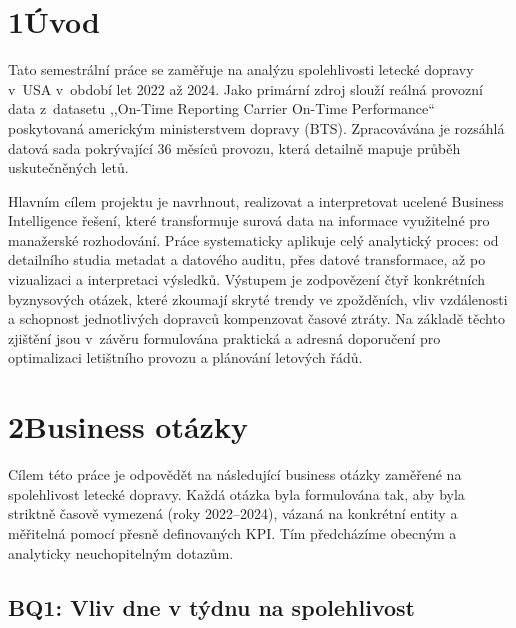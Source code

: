 \documentclass{protokol}
\begin{document}
\maketitle\newpage
\tableofcontents\newpage
{}

\section{1\quad Úvod}

Tato semestrální práce se zaměřuje na analýzu spolehlivosti letecké dopravy v~USA v~období let 2022 až 2024. Jako primární zdroj slouží reálná provozní data z~datasetu ,,On-Time Reporting Carrier On-Time Performance`` poskytovaná americkým ministerstvem dopravy (BTS). Zpracovávána je rozsáhlá datová sada pokrývající 36 měsíců provozu, která detailně mapuje průběh uskutečněných letů.

Hlavním cílem projektu je navrhnout, realizovat a interpretovat ucelené Business Intelligence řešení, které transformuje surová data na informace využitelné pro manažerské rozhodování. Práce systematicky aplikuje celý analytický proces: od detailního studia metadat a datového auditu, přes datové transformace, až po vizualizaci a interpretaci výsledků. Výstupem je zodpovězení čtyř konkrétních byznysových otázek, které zkoumají skryté trendy ve zpožděních, vliv vzdálenosti a schopnost jednotlivých dopravců kompenzovat časové ztráty. Na základě těchto zjištění jsou v~závěru formulována praktická a adresná doporučení pro optimalizaci letištního provozu a plánování letových řádů.

\section{2\quad Business otázky}

Cílem této práce je odpovědět na následující business otázky zaměřené na spolehlivost letecké dopravy. Každá otázka byla formulována tak, aby byla striktně časově vymezená (roky 2022--2024), vázaná na konkrétní entity a měřitelná pomocí přesně definovaných KPI. Tím předcházíme obecným a analyticky neuchopitelným dotazům.

\subsection{BQ1: Vliv dne v týdnu na spolehlivost}
\end{document}

